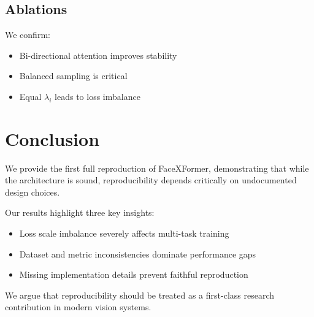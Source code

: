 \subsection{Ablations}

We confirm:
\begin{itemize}
\item Bi-directional attention improves stability
\item Balanced sampling is critical
\item Equal $\lambda_i$ leads to loss imbalance
\end{itemize}

\section{Conclusion}

We provide the first full reproduction of FaceXFormer, demonstrating that while the architecture is sound, reproducibility depends critically on undocumented design choices.

Our results highlight three key insights:
\begin{itemize}
\item Loss scale imbalance severely affects multi-task training
\item Dataset and metric inconsistencies dominate performance gaps
\item Missing implementation details prevent faithful reproduction
\end{itemize}

We argue that reproducibility should be treated as a first-class research contribution in modern vision systems.
